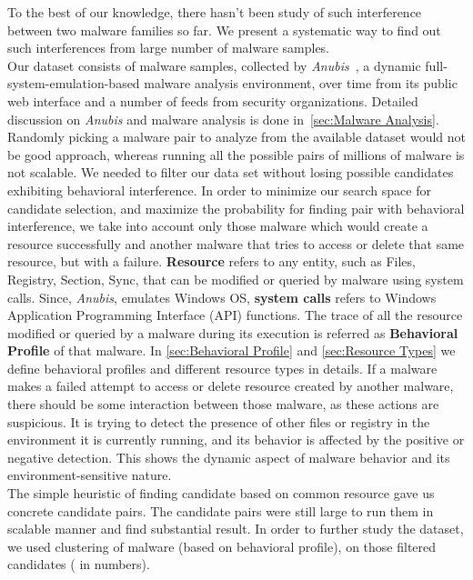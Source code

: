 To the best of our knowledge, there hasn't been study of such interference between two malware families so far.
We present a systematic way to find out such interferences from large number of malware samples.\\
Our dataset consists of {\gettotalmalwarei{}} malware samples, collected by \emph{Anubis}~\cite[]{anubis}, a dynamic full-system-emulation-based malware analysis environment, over time from its public web interface and a number of feeds from security organizations.
Detailed discussion on \emph{Anubis} and malware analysis is done in~\autoref{sec:Malware Analysis}.
Randomly picking a malware pair to analyze from the available dataset would not be good approach, whereas running all the possible pairs of millions of malware is not scalable.
We needed to filter our data set without losing possible candidates exhibiting behavioral interference.
In order to minimize our search space for candidate selection, and maximize the probability for finding pair with behavioral interference, we take into account only those malware which would create a resource successfully and another malware that tries to access or delete that same resource, but with a failure.
\textbf{Resource} refers to any entity, such as Files, Registry, Section, Sync, that can be modified or queried by malware using system calls.
Since, \emph{Anubis}, emulates Windows OS, \textbf{system calls} refers to Windows Application Programming Interface (API) functions.
The trace of all the resource modified or queried by a malware during its execution is referred as \textbf{Behavioral Profile} of that malware.
In \autoref{sec:Behavioral Profile} and \autoref{sec:Resource Types} we define behavioral profiles and different resource types in details.
If a malware makes a failed attempt to access or delete resource created by another malware, there should be some interaction between those malware, as these actions are suspicious.
It is trying to detect the presence of other files or registry in the environment it is currently running, and its behavior is affected by the positive or negative detection.
This shows the dynamic aspect of malware behavior and its environment-sensitive nature.\\
The simple heuristic of finding candidate based on common resource gave us concrete candidate pairs.
The candidate pairs were still large to run them in scalable manner and find substantial result.
In order to further study the dataset, we used clustering of malware (based on behavioral profile), on those filtered candidates (\gettotalmalwareiii{} in numbers).
